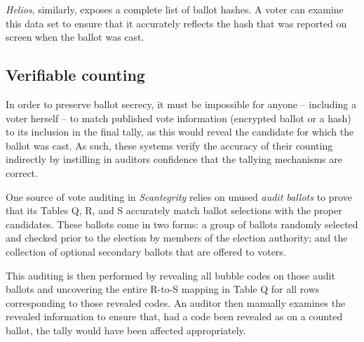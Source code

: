 \documentclass[10pt,twocolumn]{article}
\newcommand{\term}[1]{\textit{#1}}
\begin{document}
\term{Helios}, similarly, exposes a complete list of ballot hashes. A voter can examine this data set to
ensure that it accurately reflects the hash that was reported on screen when the ballot was cast.

\subsection{Verifiable counting}

In order to preserve ballot secrecy, it must be impossible for anyone -- including a voter
herself -- to match published vote information (encrypted ballot or a hash) to its inclusion in
the final tally, as this would reveal the candidate for which the ballot was cast. As such, these
systems verify the accuracy of their counting indirectly by instilling in auditors confidence that
the tallying mechanisms are correct.

One source of vote auditing in \term{Scantegrity} relies on unused \term{audit ballots} to prove that its
Tables Q, R, and S accurately match ballot selections with the proper candidates. These ballots come
in two forms: a group of ballots randomly selected and checked prior to the election by members of
the election authority; and the collection of optional secondary ballots that are offered to voters.

This auditing is then performed by revealing all bubble codes on those audit ballots and uncovering the
entire R-to-S mapping in Table Q for all rows corresponding to those revealed codes. An auditor then
manually examines the revealed information to ensure that, had a code been revealed as on a counted
ballot, the tally would have been affected appropriately.
\end{document}

